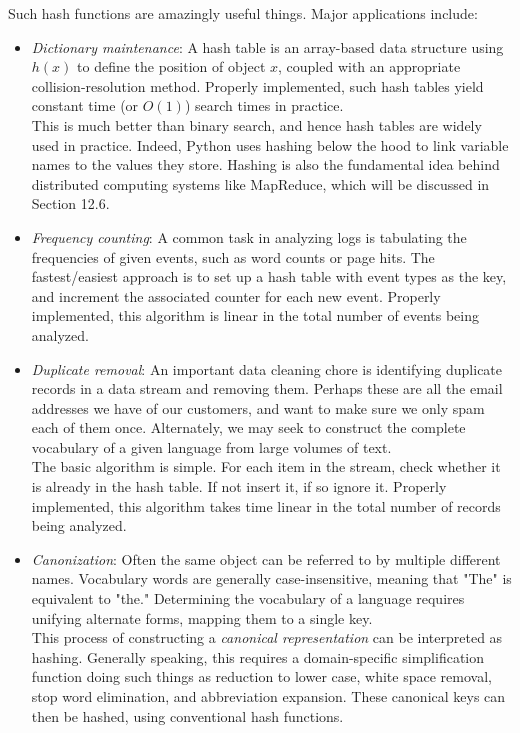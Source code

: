\documentclass[10pt]{article}
\begin{document}
\begin{enumerate}
Such hash functions are amazingly useful things. Major applications include:
\begin{itemize}
    \item \textit{Dictionary maintenance}: A hash table is an array-based data structure using $h(x)$ to define the position of object $x$, coupled with an appropriate collision-resolution method. Properly implemented, such hash tables yield constant time (or $O(1)$) search times in practice.\\
    This is much better than binary search, and hence hash tables are widely used in practice. Indeed, Python uses hashing below the hood to link variable names to the values they store. Hashing is also the fundamental idea behind distributed computing systems like MapReduce, which will be discussed in Section 12.6.
    \item \textit{Frequency counting}: A common task in analyzing logs is tabulating the frequencies of given events, such as word counts or page hits. The fastest/easiest approach is to set up a hash table with event types as the key, and increment the associated counter for each new event. Properly implemented, this algorithm is linear in the total number of events being analyzed.
    \item \textit{Duplicate removal}: An important data cleaning chore is identifying duplicate records in a data stream and removing them. Perhaps these are all the email addresses we have of our customers, and want to make sure we only spam each of them once. Alternately, we may seek to construct the complete vocabulary of a given language from large volumes of text.\\
    The basic algorithm is simple. For each item in the stream, check whether it is already in the hash table. If not insert it, if so ignore it. Properly implemented, this algorithm takes time linear in the total number of records being analyzed.
    \item \textit{Canonization}: Often the same object can be referred to by multiple different names. Vocabulary words are generally case-insensitive, meaning that "The" is equivalent to "the." Determining the vocabulary of a language requires unifying alternate forms, mapping them to a single key.\\
    This process of constructing a \textit{canonical representation} can be interpreted as hashing. Generally speaking, this requires a domain-specific simplification function doing such things as reduction to lower case, white space removal, stop word elimination, and abbreviation expansion. These canonical keys can then be hashed, using conventional hash functions.

\end{itemize}
\end{enumerate}
\end{document}
